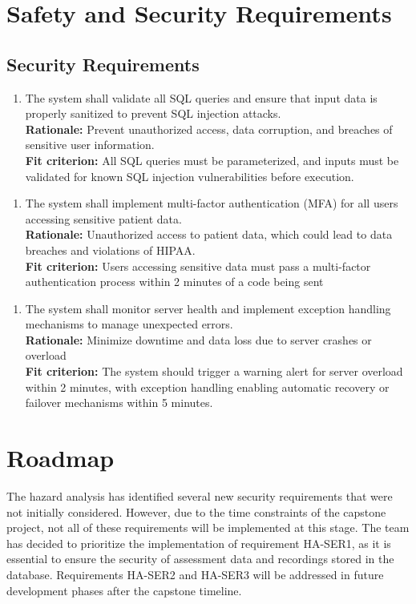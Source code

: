 \documentclass{article}
\begin{document}
\section{Safety and Security Requirements}
\subsection{Security Requirements}
\begin{enumerate}[{HA-SER}1. ]
    \item The system shall validate all SQL queries and ensure that input data is properly sanitized to prevent SQL injection attacks.\\
    \textbf{Rationale: }Prevent unauthorized access, data corruption, and breaches of sensitive user information.\\
    \textbf{Fit criterion: }All SQL queries must be parameterized, and inputs must be validated for known SQL injection vulnerabilities before execution.\\ 
  \end{enumerate}
\begin{enumerate}[{HA-SER}2. ]
    \item The system shall implement multi-factor authentication (MFA) for all users accessing sensitive patient data.\\
    \textbf{Rationale: }Unauthorized access to patient data, which could lead to data breaches and violations of HIPAA.\\
    \textbf{Fit criterion: }Users accessing sensitive data must pass a multi-factor authentication process within 2 minutes of a code being sent\\
  \end{enumerate}
\begin{enumerate}[{HA-SER}3. ]
    \item The system shall monitor server health and implement exception handling mechanisms to manage unexpected errors.\\
    \textbf{Rationale: }Minimize downtime and data loss due to server crashes or overload\\
    \textbf{Fit criterion: }The system should trigger a warning alert for server overload within 2 minutes, with exception handling enabling automatic recovery or failover mechanisms within 5 minutes.\\
  \end{enumerate}
\section{Roadmap}
\hspace{1.5em} The hazard analysis has identified several new security requirements that were 
not initially considered. However, due to the time constraints of the capstone 
project, not all of these requirements will be implemented at this stage. The 
team has decided to prioritize the implementation of requirement HA-SER1, as it
is essential to ensure the security of assessment data and recordings stored in the database. Requirements HA-SER2 and
HA-SER3 will be addressed in future development phases after the capstone timeline.
\newpage
\end{document}
